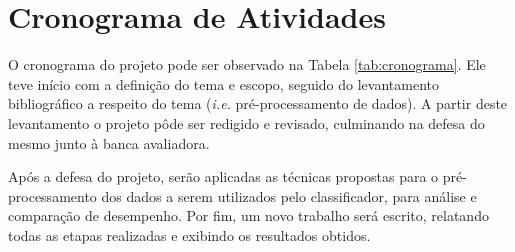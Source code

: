 \section{Cronograma de Atividades}
\label{sec:cronograma-atividades}

O cronograma do projeto pode ser observado na Tabela \ref{tab:cronograma}. Ele teve início com a definição do tema e escopo, seguido do levantamento bibliográfico a respeito do tema (\textit{i.e.} pré\hyp{}processamento de dados). A partir deste levantamento o projeto pôde ser redigido e revisado, culminando na defesa do mesmo junto à banca avaliadora.

Após a defesa do projeto, serão aplicadas as técnicas propostas para o pré\hyp{}processamento dos dados a serem utilizados pelo classificador, para análise e comparação de desempenho. Por fim, um novo trabalho será escrito, relatando todas as etapas realizadas e exibindo os resultados obtidos.

